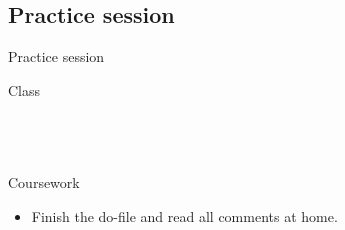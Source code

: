 \documentclass[t]{beamer}
\begin{document}
	\subsection{Practice session}
  
	\begin{frame}[t]{Practice session}

    \begin{block}{Class}
      \\
      \\
      
			\\
			\\    
    \end{block}

    \begin{alertblock}{Coursework}
      \begin{itemize}
	       \item Finish the do-file and read all comments at home.
      \end{itemize}
    \end{alertblock}
    		
	\end{frame}
	
\end{document}
